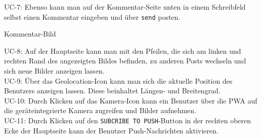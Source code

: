 UC-7:
Ebenso kann man auf der Kommentar-Seite unten in einem Schreibfeld selbst einen Kommentar eingeben und über \texttt{send} posten.

Kommentar-Bild

UC-8:
Auf der Hauptseite kann man mit den Pfeilen, die sich am linken und rechten Rand des angezeigten Bildes befinden, zu anderen Posts wechseln und sich neue Bilder anzeigen lassen.\\

UC-9:
Über das Geolocation-Icon kann man sich die aktuelle Position des Benutzers anzeigen lassen. Diese beinhaltet Längen- und Breitengrad.\\

UC-10:
Durch Klicken auf das Kamera-Icon kann ein Benutzer über die PWA auf die geräteintegrierte Kamera zugreifen und Bilder aufnehmen.\\

UC-11:
Durch Klicken auf den \texttt{SUBCRIBE TO PUSH}-Button in der rechten oberen Ecke der Hauptseite kann der Benutzer Push-Nachrichten aktivieren.
